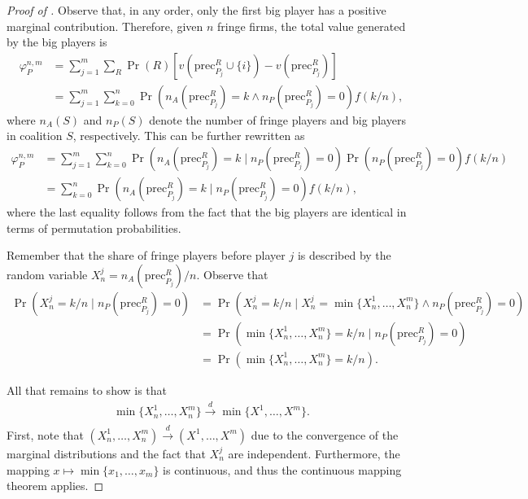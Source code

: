 \documentclass[a4paper]{article}
\newcommand{\precede}{\mathrm{prec}}
\begin{document}
\begin{proof}[Proof of ]
    Observe that, in any order, only the first big player has a positive marginal contribution.
    Therefore, given $n$ fringe firms, the total value generated by the big players is
    \begin{align*}
        \varphi^{n, m}_P &= \sum_{j=1}^m \sum_R \Pr(R) [ v(\precede^R_{P_j} \cup \{i\}) - v(\precede^R_{P_j}) ] \\
        &= \sum_{j=1}^m \sum_{k=0}^n \Pr(n_A(\precede^R_{P_j}) = k \land n_P(\precede^R_{P_j}) = 0) f(k/n),
    \end{align*}
    where $n_A(S)$ and $n_P(S)$ denote the number of fringe players and big players in coalition $S$, respectively.
    This can be further rewritten as
    \begin{align*}
        \varphi^{n, m}_P &= \sum_{j=1}^m \sum_{k=0}^n \Pr(n_A(\precede^R_{P_j}) = k \mid n_P(\precede^R_{P_j}) = 0) \Pr(n_P(\precede^R_{P_j}) = 0) f(k/n) \\
        &= \sum_{k=0}^n \Pr(n_A(\precede^R_{P_j}) = k \mid n_P(\precede^R_{P_j}) = 0) f(k/n),
    \end{align*}
    where the last equality follows from the fact that the big players are identical in terms of permutation probabilities.

    Remember that the share of fringe players before player $j$ is described by the random variable $X_n^j = n_A(\precede^R_{P_j}) / n$.
    Observe that
    \begin{align*}
        \Pr(X_n^j = k/n \mid n_P(\precede^R_{P_j}) = 0) &= \Pr(X_n^j = k/n \mid X_n^j = \min\{X_n^1, \dots, X_n^m\} \land n_P(\precede^R_{P_j}) = 0) \\
        &= \Pr(\min\{X_n^1, \dots, X_n^m\} = k/n \mid n_P(\precede^R_{P_j}) = 0) \\
        &= \Pr(\min\{X_n^1, \dots, X_n^m\} = k/n).
    \end{align*}

    All that remains to show is that
    \begin{align*}
        \min\{X_n^1, \dots, X_n^m\} \xrightarrow[]{d} \min\{X^1, \dots, X^m\}.
    \end{align*}
    First, note that $(X_n^1, \dots, X_n^m) \xrightarrow[]{d} (X^1, \dots, X^m)$ due to the convergence of the marginal distributions and the fact that $X_n^j$ are independent.
    Furthermore, the mapping $x \mapsto \min\{x_1, \dots, x_m\}$ is continuous, and thus the continuous mapping theorem applies.


\end{proof}
\end{document}
